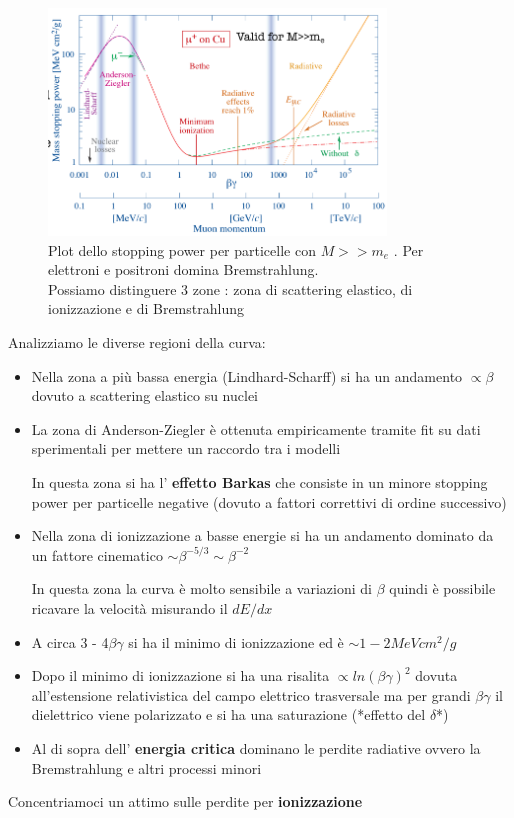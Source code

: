         \begin{figure}[H]
            \centering
            \includegraphics[width=0.8\textwidth,frame]{Chapters/images/Interazione_radiazione_materia/image-20220214171429817.png}
            \caption{Plot dello stopping power per particelle con $M>>m_e$ . Per elettroni e positroni domina Bremstrahlung.\\Possiamo distinguere 3 zone : zona di scattering elastico, di ionizzazione e di Bremstrahlung}
            \label{fig:betheblock}
        \end{figure}
    Analizziamo le diverse regioni della curva:
    \begin{itemize}
        \item Nella zona a più bassa energia (Lindhard-Scharff) si ha un andamento $\propto \beta$ dovuto a scattering elastico su nuclei

        \item La zona di Anderson-Ziegler è ottenuta empiricamente tramite fit su dati sperimentali per mettere un raccordo tra i modelli

        In questa zona si ha l' \textbf{effetto Barkas} che consiste in un minore stopping power per particelle negative (dovuto a fattori correttivi di ordine successivo)

        \item Nella zona di ionizzazione a basse energie si ha un andamento dominato da un fattore cinematico $\sim \beta^{-5/3} \sim \beta^{-2}$

        In questa zona la curva è molto sensibile a variazioni di $\beta$ quindi è possibile ricavare la velocità misurando il $dE/dx$

        \item A circa 3 - 4$\beta \gamma$ si ha il minimo di ionizzazione ed è $\sim 1-2 MeV cm^2/g$

        \item Dopo il minimo di ionizzazione si ha una risalita $\propto ln(\beta \gamma)^2$ dovuta all'estensione relativistica del campo elettrico trasversale ma per grandi $\beta \gamma$ il dielettrico viene polarizzato e si ha una saturazione (*effetto del $\delta$*)

        \item Al di sopra dell' \textbf{energia critica} dominano le perdite radiative ovvero la Bremstrahlung e altri processi minori
    \end{itemize}
Concentriamoci un attimo sulle perdite per \textbf{ionizzazione}

